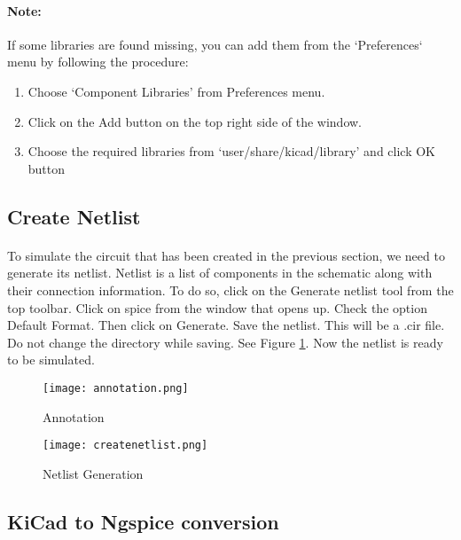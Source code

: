 \paragraph{Note:} If some libraries are found missing, you can add them from the `Preferences` menu by following the procedure: 

\begin{enumerate}
\item
Choose `Component Libraries' from Preferences menu.

\item
Click on the Add button on the top right side of the window.

\item
Choose the required libraries from `user/share/kicad/library' and click OK button

\end{enumerate}

\subsection*{Create Netlist}

\paragraph{}To simulate the circuit that has been created in the previous section, we need to generate
its netlist. Netlist is a list of components in the schematic along with their connection
information. To do so, click on the Generate netlist tool from the top toolbar. Click on
spice from the window that opens up. Check the option Default Format. Then click
on Generate. Save the netlist. This will be a .cir file. Do
not change the directory while saving. See Figure \ref{createnetlistRC}.
 Now the netlist is ready to be simulated. 
\begin{figure}
\begin{minipage}{.5\textwidth}
  \centering
  \texttt{[image: annotation.png]}
  \caption{Annotation}
  \label{annotationRC}
\end{minipage}%
\begin{minipage}{.5\textwidth}
  \centering
  \texttt{[image: createnetlist.png]}
  \caption{Netlist Generation}
  \label{createnetlistRC}
\end{minipage}
\end{figure}

\subsection*{KiCad to Ngspice conversion}

